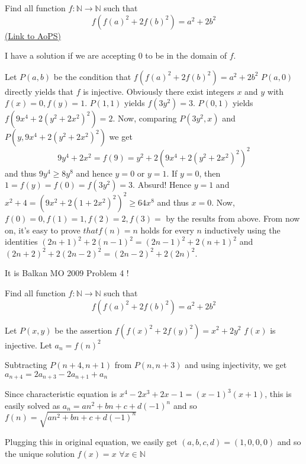 \begin{problem}
	Find all function $f : \mathbb{N} \longrightarrow \mathbb{N}$ such that
\[f(f(a)^2+2f(b)^2) = a^2+2b^2\]
	\flushright \href{https://artofproblemsolving.com/community/c6h612601}{(Link to AoPS)}
\end{problem}



\begin{solution}
	I have a solution if we are accepting $0$ to be in the domain of $f$.

Let $P(a,b)$ be the condition that $f(f(a)^2+2f(b)^2) = a^2+2b^2$
$P(a,0)$ directly yields that $f$ is injective.
Obviously there exist integers $x$ and $y$ with $f(x)=0, f(y)=1$.
$P(1,1)$ yields $f(3y^2)=3$.
$P(0,1)$ yields $f(9x^4+2(y^2+2x^2)^2)=2$.
Now, comparing $P(3y^2,x)$ and $P(y,9x^4+2(y^2+2x^2)^2)$ we get
\[9y^4+2x^2=f(9)=y^2+2(9x^4+2(y^2+2x^2)^2)^2\]
and thus $9y^4 \ge 8y^8$ and hence $y=0$ or $y=1$. If $y=0$, then $1=f(y)=f(0)=f(3y^2)=3$. Absurd!
Hence $y=1$ and $x^2+4=(9x^2+2(1+2x^2)^2)^2 \ge 64x^8$ and thus $x=0$.
Now, $f(0)=0, f(1)=1, f(2)=2, f(3)=$ by the results from above.
From now on, it's easy to prove $that f(n)=n$ holds for every $n$ inductively using the identities $(2n+1)^2+2(n-1)^2=(2n-1)^2+2(n+1)^2$ and $(2n+2)^2+2(2n-2)^2=(2n-2)^2+2(2n)^2$.
\end{solution}



\begin{solution}
	It is Balkan MO 2009 Problem 4 !
\end{solution}



\begin{solution}
	\begin{tcolorbox}Find all function $f : \mathbb{N} \longrightarrow \mathbb{N}$ such that
\[f(f(a)^2+2f(b)^2) = a^2+2b^2\]\end{tcolorbox}
Let $P(x,y)$ be the assertion $f(f(x)^2+2f(y)^2)=x^2+2y^2$
$f(x)$ is injective.
Let $a_n=f(n)^2$

Subtracting $P(n+4,n+1)$ from $P(n,n+3)$ and using injectivity, we get  $a_{n+4}=2a_{n+3}-2a_{n+1}+a_n$

Since characteristic equation is $x^4-2x^3+2x-1=(x-1)^3(x+1)$, this is easily solved as $a_n=an^2+bn+c+d(-1)^n$ 
and so $f(n)=\sqrt{an^2+bn+c+d(-1)^n}$

Plugging this in original equation, we easily get $(a,b,c,d)=(1,0,0,0)$ and so the unique solution $\boxed{f(x)=x}$ $\forall x\in\mathbb N$
\end{solution}



